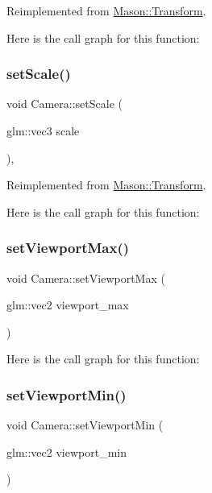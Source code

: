 Reimplemented from \hyperlink{class_mason_1_1_transform_a740f389e20c0190c52bcb893aeaa0490}{Mason\+::\+Transform}.

Here is the call graph for this function\+:
\hypertarget{class_mason_1_1_camera_a732501ee31e862f557bbbc8ff58631a4}{}\label{class_mason_1_1_camera_a732501ee31e862f557bbbc8ff58631a4} 
\subsubsection{\texorpdfstring{set\+Scale()}{setScale()}}
{\footnotesize\ttfamily void Camera\+::set\+Scale (\begin{DoxyParamCaption}\item[{glm\+::vec3}]{scale }\end{DoxyParamCaption})\hspace{0.3cm}{\ttfamily [override]}, {\ttfamily [virtual]}}



Reimplemented from \hyperlink{class_mason_1_1_transform_a4a273ac58f45b6ee9cf2b37cf661daac}{Mason\+::\+Transform}.

Here is the call graph for this function\+:
\hypertarget{class_mason_1_1_camera_a1f9a7896bb617d1402e3c4738324e1ea}{}\label{class_mason_1_1_camera_a1f9a7896bb617d1402e3c4738324e1ea} 
\subsubsection{\texorpdfstring{set\+Viewport\+Max()}{setViewportMax()}}
{\footnotesize\ttfamily void Camera\+::set\+Viewport\+Max (\begin{DoxyParamCaption}\item[{glm\+::vec2}]{viewport\+\_\+max }\end{DoxyParamCaption})}

Here is the call graph for this function\+:
\hypertarget{class_mason_1_1_camera_aa630259d7e0c0124dec5c9aaf33b7160}{}\label{class_mason_1_1_camera_aa630259d7e0c0124dec5c9aaf33b7160} 
\subsubsection{\texorpdfstring{set\+Viewport\+Min()}{setViewportMin()}}
{\footnotesize\ttfamily void Camera\+::set\+Viewport\+Min (\begin{DoxyParamCaption}\item[{glm\+::vec2}]{viewport\+\_\+min }\end{DoxyParamCaption})}

